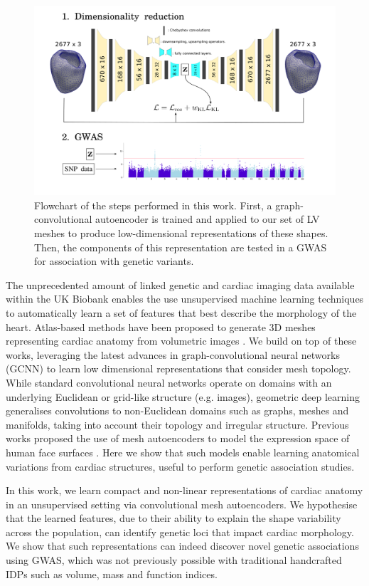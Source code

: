 \begin{figure}
\includegraphics[width=\textwidth]{figs/workflow.png}
\caption{Flowchart of the steps performed in this work. First, a graph-convolutional autoencoder is trained and applied to our set of LV meshes to produce low-dimensional representations of these shapes. Then, the components of this representation are tested in a GWAS for association with genetic variants.}
\label{fig:flowchart}
\end{figure}

The unprecedented amount of linked genetic and cardiac imaging data available within the UK Biobank \cite{ref_ukbb} enables the use unsupervised machine learning techniques to automatically learn a set of features that best describe the morphology of the heart. Atlas-based methods have been proposed to generate 3D meshes representing cardiac anatomy from volumetric images \cite{ref_rahman, ref_zhuang_regis_2O10}. We build on top of these works, leveraging the latest advances in graph-convolutional neural networks (GCNN) \cite{ref_bronstein_geom_DL} to learn low dimensional representations that consider mesh topology. While standard convolutional neural networks operate on domains with an underlying Euclidean or grid-like structure (e.g. images), geometric deep learning generalises convolutions to non-Euclidean domains such as graphs, meshes and manifolds, taking into account their topology and irregular structure. Previous works proposed the use of mesh autoencoders to model the expression space of human face surfaces \cite{ref_coma}. Here we show that such models enable learning anatomical variations from cardiac structures, useful to perform genetic association studies.

In this work, we learn compact and non-linear representations of cardiac anatomy in an unsupervised setting via convolutional mesh autoencoders. We hypothesise that the learned features, due to their ability to explain the shape variability across the population, can identify genetic loci that impact cardiac morphology. We show that such representations can indeed discover novel genetic associations using GWAS, which was not previously possible with traditional handcrafted IDPs such as volume, mass and function indices. 
